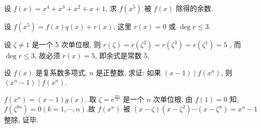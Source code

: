 \begin{exercise}
	设 $f(x)=x^4+x^3+x^2+x+1$, 求 $f\left(x^5\right)$ 被 $f(x)$ 除得的余数.
\end{exercise}
\begin{solution}
	设 $f\left(x^5\right)=f(x) q(x)+r(x)$, 这里 $r(x)=0$ 或 $\operatorname{deg} r \leqslant 3$.

	设 $\zeta \neq 1$ 是一个 5 次单位根, 则 $r(\zeta)=r\left(\zeta^2\right)=r\left(\zeta^3\right)=r\left(\zeta^1\right)=5$ , 而 $\operatorname{deg} r \leqslant 3$, 故必须 $r(x)=5$, 即余式是常数 5.
\end{solution}

\begin{exercise}
	设 $f(x)$ 是复系数多项式, $n$ 是正整数, 求证: 如果 $(x-1) \mid f\left(x^n\right)$, 则 $\left(x^n-1\right) \mid f\left(x^n\right)$.
\end{exercise}
\begin{solution}
	$f\left(x^n\right)=(x-1) g(x)$.
	取 $\zeta=\mathrm{e}^{\frac{2 \pi i}{n}}$ 是一个 $n$ 次单位根, 由 $f(1)=0$ 知,  $f\left(\zeta^{b n}\right)=0(k=1, \cdots, n)$.故 $f\left(x^n\right)$ 被 $(x-\zeta)\left(x-\zeta^2\right) \cdots\left(x-\zeta^n\right)=x^n-1$ 整除, 证毕. 
\end{solution}

